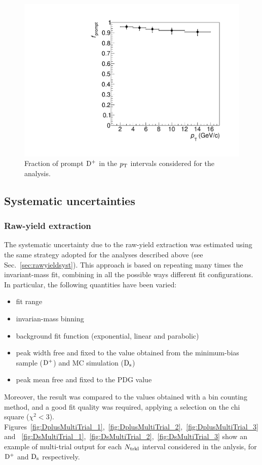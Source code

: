 \begin{figure}[htpb]
\centering
 \includegraphics[width=.7\textwidth]{FigCap6/DplusFprompt_Nb_d0cut_1_200.pdf}
  \caption{Fraction of prompt ${\rm D^+}$ in the $p_{\rm T}$ intervals considered for the analysis.}
 \label{fig:DplusfPromptVsNtrkl}
\end{figure}

\subsection {Systematic uncertainties}
\subsubsection{Raw-yield extraction}
The systematic uncertainty due to the raw-yield extraction was estimated using the same strategy adopted for the analyses described above (see Sec.~\ref{sec:rawyieldsyst}). This approach is based on repeating many times the invariant-mass fit, combining in all the possible ways different fit configurations. In particular, the following quantities have been varied:
\begin{itemize}
\item fit range
\item invarian-mass binning
\item background fit function (exponential, linear and parabolic)
\item peak width free and fixed to the value obtained from the minimum-bias sample (${\rm D^+}$) and MC simulation (${\rm D_s}$)
\item peak mean free and fixed to the PDG value
\end{itemize} 
Moreover, the result was compared to the values obtained with a bin counting method, and a good fit quality was required, applying a selection on the chi square ($\chi^2<3$). Figures~\ref{fig:DplusMultiTrial_1},~\ref{fig:DplusMultiTrial_2},~\ref{fig:DplusMultiTrial_3} and ~\ref{fig:DsMultiTrial_1},~\ref{fig:DsMultiTrial_2},~\ref{fig:DsMultiTrial_3} show an example of multi-trial output for each $N_{\rm trkl}$ interval considered in the anlysis, for ${\rm D^+}$ and ${\rm D_s}$ respectively.  
 
